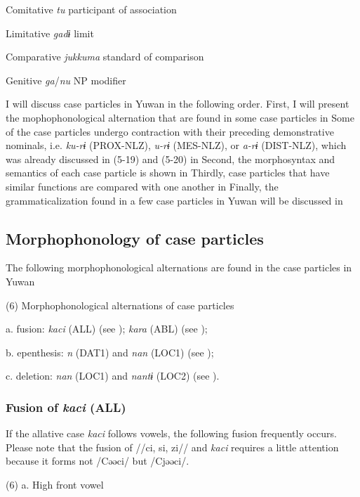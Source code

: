 Comitative  \textit{tu}  participant of association

Limitative  \textit{gadɨ}  limit

Comparative  \textit{jukkuma}  standard of comparison

Genitive  \textit{ga}/\textit{nu}  NP modifier

I will discuss case particles in Yuwan in the following order. First, I will present the mophophonological alternation that are found in some case particles in  Some of the case particles undergo contraction with their preceding demonstrative nominals, i.e. \textit{ku-rɨ} (PROX-NLZ), \textit{u-rɨ} (MES-NLZ), or \textit{a-rɨ} (DIST-NLZ), which was already discussed in (5-19) and (5-20) in  Second, the morphosyntax and semantics of each case particle is shown in  Thirdly, case particles that have similar functions are compared with one another in  Finally, the grammaticalization found in a few case particles in Yuwan will be discussed in 

\subsection{Morphophonology of case particles}

The following morphophonological alternations are found in the case particles in Yuwan

(6) Morphophonological alternations of case particles

  a. fusion:         \textit{kaci} (ALL) (see ); \textit{kara} (ABL) (see );

b. epenthesis:         \textit{n} (DAT1) and \textit{nan} (LOC1) (see );

c. deletion:         \textit{nan} (LOC1) and \textit{nantɨ} (LOC2) (see ).

\subsubsection{Fusion of \textit{kaci} (ALL)}
\label{bkm:Ref365151806}
If the allative case \textit{kaci} follows vowels, the following fusion frequently occurs. Please note that the fusion of //ci, si, zi// and \textit{kaci} requires a little attention because it forms not /Cəəci/ but /Cjəəci/.

(6)  a.  High front vowel

